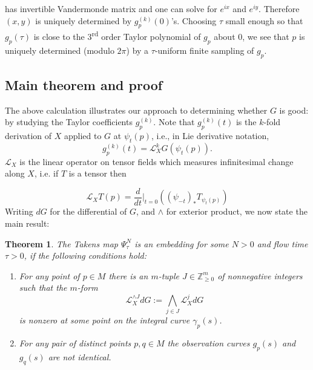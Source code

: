 \documentclass[11pt]{article}
\newcommand{\ChrisEdit}[1]{\textcolor{red}{(#1)}}
\newtheorem{theorem}{Theorem}[section]
\theoremstyle{definition}
\theoremstyle{remark}
\newcommand{\ZZ}{\mathbb{Z}}
\newcommand{\Ld}{\mathcal{L}}
\newcommand{\ts}{\textsuperscript}
\begin{document}
    has invertible Vandermonde matrix and one can solve for $e^{ix}$ and $e^{iy}$. Therefore $(x,y)$ is uniquely determined by $g_p^{(k)}(0)$'s. Choosing $\tau$ small enough so that $g_p(\tau)$ is close to the 3\ts{rd} order Taylor polynomial of $g_p$ about $0$, we see that $p$ is uniquely determined (modulo $2\pi$) by a $\tau$-uniform finite sampling of $g_p$.

      \subsection{Main theorem and proof}
    The above calculation illustrates our approach to determining whether $G$ is good: by studying the Taylor coefficients $g_p^{(k)}$. Note that $g_p^{(k)}(t)$ is the $k$-fold derivation of $X$ applied to $G$ at $\psi_t(p)$, i.e., in Lie derivative notation,
    \[g_p^{(k)}(t) = \Ld_X^kG(\psi_t(p)).\]
    $\Ld_X$ is the linear operator on tensor fields which measures infinitesimal change along $X$, i.e. if $T$ is a tensor then

    \[\Ld_XT(p) = \frac{d}{dt}\bigg|_{t=0}((\psi_{-t})_*T_{\psi_t(p)})\]
    Writing $dG$ for the differential of $G$, and $\wedge$ for exterior product, we now state the main result:

    \begin{theorem}\label{thm:main}
    The Takens map $\Psi_{\tau}^{N}$ is an embedding for some $N>0$ and flow time $\tau>0$, if the following conditions hold:
        \begin{enumerate}
        \item For any point of $p\in M$ there is an $m$-tuple $J\in \ZZ_{\geq 0}^m$ of nonnegative integers such that the $m$-form
        \[\Ld_{X}^{\wedge J}dG := \bigwedge_{j\in J}\Ld_X^jdG\]
        is nonzero at some point on the integral curve $\gamma_p(s)$.

        \item For any pair of distinct points $p, q\in M$ the observation curves $g_p(s)$ and $g_q(s)$ are not identical.
        \end{enumerate}
    \end{theorem}
\end{document}
